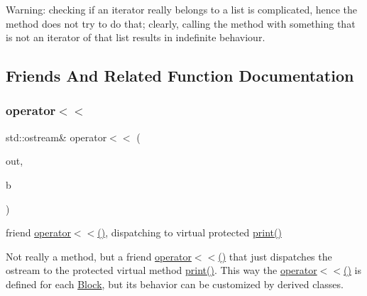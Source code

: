 Warning\+: checking if an iterator really belongs to a list is complicated, hence the method does not try to do that; clearly, calling the method with something that is not an iterator of that list results in indefinite behaviour. 

\subsection{Friends And Related Function Documentation}
\mbox{\label{class_s_m_spp__di__unipi__it_1_1_block_aaf14d09576853bb38438285dacb32655}} 
\subsubsection{\texorpdfstring{operator$<$$<$}{operator<<}}
{\footnotesize\ttfamily std\+::ostream\& operator$<$$<$ (\begin{DoxyParamCaption}\item[{std\+::ostream \&}]{out,  }\item[{const \mbox{\hyperlink{class_s_m_spp__di__unipi__it_1_1_block}{Block}} \&}]{b }\end{DoxyParamCaption})\hspace{0.3cm}{\ttfamily [friend]}}



friend \mbox{\hyperlink{class_s_m_spp__di__unipi__it_1_1_block_aaf14d09576853bb38438285dacb32655}{operator$<$$<$()}}, dispatching to virtual protected \mbox{\hyperlink{class_s_m_spp__di__unipi__it_1_1_block_a2e7b9c9148a98c5c342e8c25cac95926}{print()}} 

Not really a method, but a friend \mbox{\hyperlink{class_s_m_spp__di__unipi__it_1_1_block_aaf14d09576853bb38438285dacb32655}{operator$<$$<$()}} that just dispatches the ostream to the protected virtual method \mbox{\hyperlink{class_s_m_spp__di__unipi__it_1_1_block_a2e7b9c9148a98c5c342e8c25cac95926}{print()}}. This way the \mbox{\hyperlink{class_s_m_spp__di__unipi__it_1_1_block_aaf14d09576853bb38438285dacb32655}{operator$<$$<$()}} is defined for each \mbox{\hyperlink{class_s_m_spp__di__unipi__it_1_1_block}{Block}}, but its behavior can be customized by derived classes. \mbox{\label{class_s_m_spp__di__unipi__it_1_1_block_a7124899e39ee61687c43c1061d3a0353}} 
